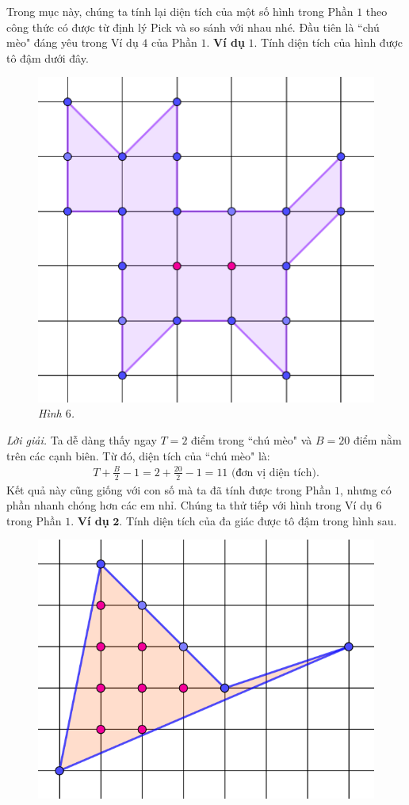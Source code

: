 \begin{multicols}{2}
	\vskip 0.1cm
	Trong mục này, chúng ta tính lại diện tích của một số hình trong Phần $1$ theo công thức có được từ định lý Pick và so sánh với nhau nhé.
	Đầu tiên là ``chú mèo" đáng yêu trong Ví dụ $4$ của Phần $1$.
	\vskip 0.1cm
	\textbf{\color{toancuabi}Ví dụ} $1$. Tính diện tích của hình được tô đậm dưới đây.
	\begin{figure}[H]
		\vspace*{-5pt}
		\centering
		\captionsetup{labelformat= empty, justification=centering}
		\includegraphics[width= 0.45\linewidth]{6}
		\caption{\small\textit{\color{toancuabi}Hình $6$.}}
		\vspace*{-10pt}
	\end{figure}
	\textit{Lời giải.} Ta dễ dàng thấy ngay $T = 2$ điểm trong ``chú mèo" và $B = 20$ điểm nằm trên các cạnh biên. Từ đó, diện tích của ``chú mèo" là:
	\begin{align*}
		T + \frac{B}{2} - 1 = 2 + \frac{20}{2} - 1 = 11 \text{ (đơn vị diện tích)}.
	\end{align*}
	Kết quả này cũng giống với con số mà ta đã tính được trong Phần $1$, nhưng có phần nhanh chóng hơn các em nhỉ.
	\vskip 0.1cm
	Chúng ta thử tiếp với hình trong Ví dụ $6$ trong Phần $1$.
	\vskip 0.1cm
	\textbf{\color{toancuabi}Ví dụ} $\pmb{2.}$ Tính diện tích của đa giác được tô đậm trong hình sau.
	\begin{figure}[H]
		\vspace*{-5pt}
		\centering
		\captionsetup{labelformat= empty, justification=centering}
		\includegraphics[width= 0.55\linewidth]{7}

\end{figure}
\end{multicols}
